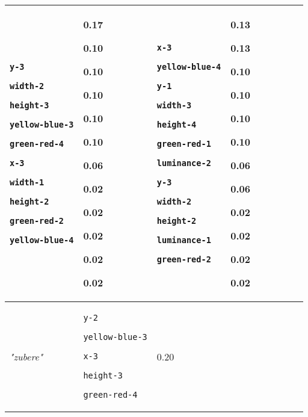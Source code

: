 {\begin{tabular}{@{}p{1.2cm}|p{2.75cm}@{}p{0.8cm}@{}|p{2.75cm}@{}p{0.8cm}@{}|p{2.75cm}@{}p{0.8cm}@{}|p{2.75cm}@{}p{0.8cm}@{}}
\texttt{y-3}

\texttt{width-2}

\texttt{height-3}

\texttt{yellow-blue-3}

\texttt{green-red-4}

\texttt{x-3}

\texttt{width-1}

\texttt{height-2}

\texttt{green-red-2}

\texttt{yellow-blue-4} & 0.17

0.10

0.10

0.10

0.10

0.10

0.06

0.02

0.02

0.02

0.02

0.02 & \texttt{x-3}

\texttt{yellow-blue-4}

\texttt{y-1}

\texttt{width-3}

\texttt{height-4}

\texttt{green-red-1}

\texttt{luminance-2}

\texttt{y-3}

\texttt{width-2}

\texttt{height-2}

\texttt{luminance-1}

\texttt{green-red-2} & 0.13

0.13

0.10

0.10

0.10

0.10

0.06

0.06

0.02

0.02

0.02

0.02\\
\hline
\textit{"zubere"} & \texttt{y-2}

\texttt{yellow-blue-3}

\texttt{x-3}

\texttt{height-3}

\texttt{green-red-4} & 0.20


\end{tabular}}
